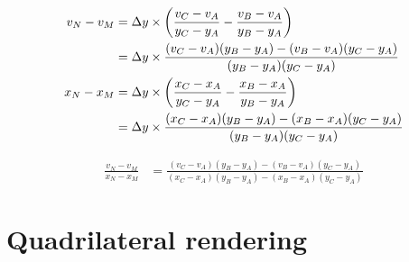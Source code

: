 \begin{align*}
v_N - v_M & = \Delta y \times \left(\frac{v_C - v_A}{y_C - y_A} - \frac{v_B - v_A}{y_B - y_A}\right) \\
& = \Delta y \times \frac{(v_C - v_A)(y_B - y_A) - (v_B - v_A)(y_C - y_A)}{(y_B - y_A)(y_C - y_A)}
\\
x_N - x_M & = \Delta y \times \left(\frac{x_C - x_A}{y_C - y_A} - \frac{x_B - x_A}{y_B - y_A}\right) \\
& = \Delta y \times \frac{(x_C - x_A)(y_B - y_A) - (x_B - x_A)(y_C - y_A)}{(y_B - y_A)(y_C - y_A)}
\end{align*}

\begin{align*}
\frac{v_N - v_M}{x_N - x_M} & = \frac{(v_C - v_A)(y_B - y_A) - (v_B - v_A)(y_C - y_A)}{(x_C - x_A)(y_B - y_A) - (x_B - x_A)(y_C - y_A)}
\end{align*}

\section{Quadrilateral rendering}
